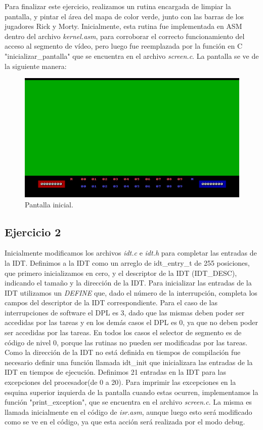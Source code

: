\documentclass[a4paper]{article}
\begin{document}
\justify
Para finalizar este ejercicio, realizamos un rutina encargada de limpiar la pantalla, y pintar el área del mapa de color verde, junto con las barras de los jugadores Rick y Morty. Inicialmente, esta rutina fue implementada en ASM dentro del archivo \textit{kernel.asm}, para corroborar el correcto funcionamiento del acceso al segmento de vídeo, pero luego fue reemplazada por la función en C  "inicializar_pantalla" que se encuentra en el archivo \textit{screen.c}. La pantalla se ve de la siguiente manera:

\begin{figure}[h]
	\centering
	\includegraphics[scale=0.6]{img/Pantalla.pdf}
	\caption{Pantalla inicial.}
\end{figure}


\subsection{Ejercicio 2}
\justify
Inicialmente modificamos los archivos \textit{idt.c} e \textit{idt.h} para completar las entradas de la IDT. Definimos a la IDT como un arreglo de idt_entry_t de 255 posiciones, que primero inicializamos en cero, y el descriptor de la IDT (IDT_DESC), indicando el tamaño y la dirección de la IDT. Para inicializar las entradas de la IDT utilizamos un \textit{DEFINE} que, dado el número de la interrupción, completa los campos del descriptor de la IDT correspondiente. Para el caso de las interrupciones de software el DPL es 3, dado que las mismas deben poder ser accedidas por las tareas y en los demás casos el DPL es 0, ya que no deben poder ser accedidas por las tareas. En todos los casos el selector de segmento es de código de nivel 0, porque las rutinas no pueden ser modificadas por las tareas. Como la dirección de la IDT no está definida en tiempos de compilación fue necesario definir una función llamada idt_init que inicializara las entradas de la IDT en tiempos de ejecución. Definimos 21 entradas en la IDT para las excepciones del procesador(de 0 a 20).
\justify
Para imprimir las excepciones en la esquina superior izquierda de la pantalla  cuando estas ocurren, implementamos la función "print_exception", que se encuentra en el archivo \textit{screen.c}. La misma es llamada inicialmente en el código de \textit{isr.asm}, aunque luego esto será modificado como se ve en el código, ya que esta acción será realizada por el modo debug. 
\end{document}
